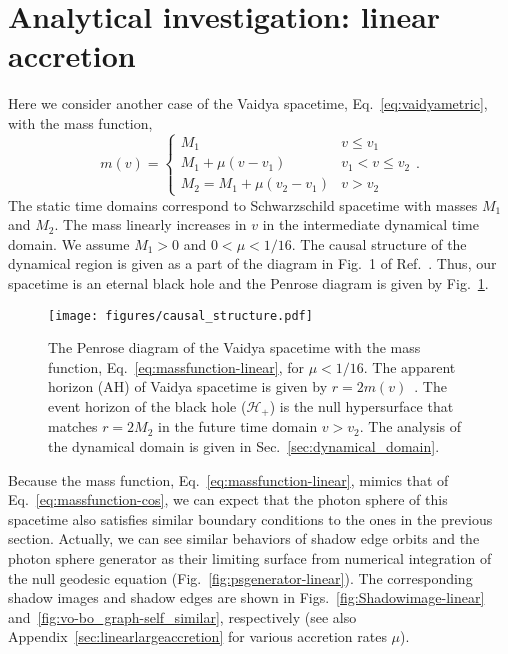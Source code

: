 \documentclass[prd,showpacs,preprintnumbers,groupedaddress,superscriptaddress,nofootinbib,11pt]{revtex4-1} %
\theoremstyle{newplain}
\begin{document}
\section{Analytical investigation: linear accretion}
\label{sec:analytical}
Here we consider another case of the Vaidya spacetime,  Eq.~\eqref{eq:vaidyametric}, with the mass function,
\begin{equation}
\label{eq:massfunction-linear}
m(v)=\left\{
\begin{array}{cc}
M_1 & v\le v_1\\
M_1+\mu\left(v-v_1\right) & v_1<v\le v_2\\
M_2=M_1+\mu\left(v_2-v_1\right) & v>v_2
\end{array}
\right. .
\end{equation}
The static time domains correspond to Schwarzschild spacetime with masses $M_1$ and $M_2$.
The mass linearly increases in $v$ in the intermediate dynamical time domain.
We assume $M_1>0$ and $0<\mu<1/16$.
The causal structure of the dynamical region is given as a part of the diagram in Fig.~1 of Ref.~\cite{Hiscock_1982}.
Thus, our spacetime is an eternal black hole and the Penrose diagram is given by Fig.~\ref{fig:causal-structure}.
\begin{figure}[t]
\texttt{[image: figures/causal\_structure.pdf]}
\caption{\label{fig:causal-structure}
The Penrose diagram of the Vaidya spacetime with the mass function, Eq.~\eqref{eq:massfunction-linear}, for $\mu<1/16$.
The apparent horizon (AH) of Vaidya spacetime is given by $r=2m(v)$~\cite{nielsen}.
The event horizon of the black hole ($\mathscr{H}_+$) is the null hypersurface that matches $r=2M_2$ in the future time domain $v>v_2$.
The analysis of the dynamical domain is given in Sec.~\ref{sec:dynamical_domain}.
}
\end{figure}
\par
Because the mass function, Eq.~\eqref{eq:massfunction-linear}, mimics that of Eq.~\eqref{eq:massfunction-cos}, we can expect that the photon sphere of this spacetime also satisfies similar boundary conditions to the ones in the previous section.
Actually, we can see similar behaviors of shadow edge orbits and the photon sphere generator as their limiting surface from numerical integration of the null geodesic equation (Fig.~\ref{fig:psgenerator-linear}). 
The corresponding shadow images and shadow edges are shown in Figs.~\ref{fig:Shadowimage-linear} and~\ref{fig:vo-bo_graph-self_similar}, respectively
(see also Appendix~\ref{sec:linearlargeaccretion} for various accretion rates $\mu$).
\end{document}
